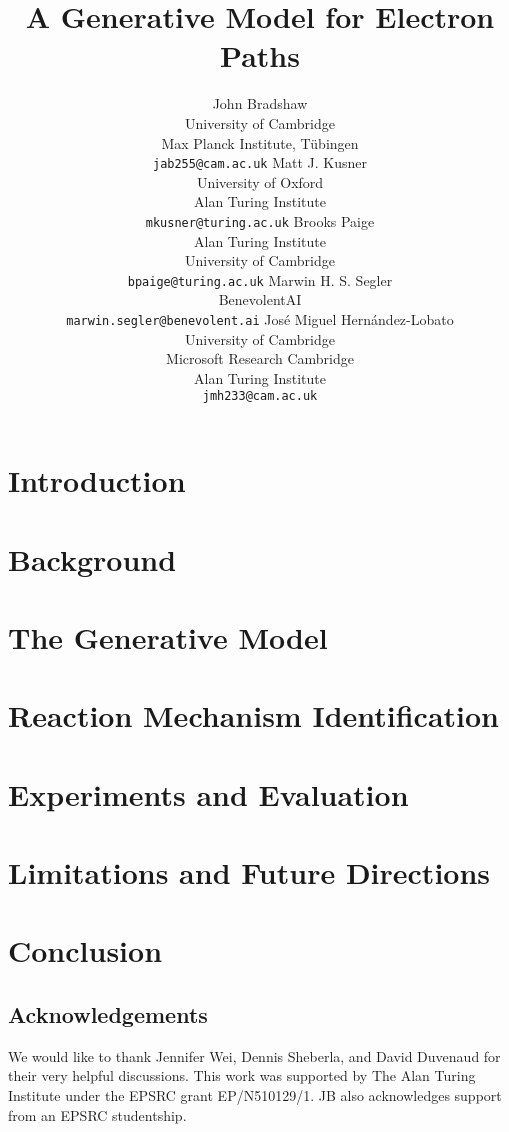 \documentclass{article} %
\title{A Generative Model for Electron Paths}
\author{John Bradshaw \\ 
University of Cambridge \\
Max Planck Institute, T\"ubingen 
\\
\texttt{jab255@cam.ac.uk}
\And
Matt J. Kusner \\
University of Oxford \\
Alan Turing Institute
\\
\texttt{mkusner@turing.ac.uk}
\And
Brooks Paige \\
Alan Turing Institute \\
University of Cambridge 
\\
\texttt{bpaige@turing.ac.uk}
\AND
Marwin H. S. Segler \\
BenevolentAI \\
\texttt{marwin.segler@benevolent.ai}
\And
Jos\'e Miguel Hern\'andez-Lobato \\
University of Cambridge \\
Microsoft Research Cambridge \\
Alan Turing Institute \\
\texttt{jmh233@cam.ac.uk}
}
\begin{document}
\maketitle



\section{Introduction}


% 

\section{Background}






\section{The Generative Model}

\label{sec:model}




\section{Reaction Mechanism Identification}




\section{Experiments and Evaluation}





\section{Limitations and Future Directions}


\section{Conclusion}



\subsection*{Acknowledgements}

We would like to thank Jennifer Wei, Dennis Sheberla, and David Duvenaud for their very helpful discussions.
This work was supported by The Alan Turing Institute under the EPSRC grant EP/N510129/1. 
JB also acknowledges support from an EPSRC studentship.



%


\appendix
\vfill
\pagebreak

\end{document}
